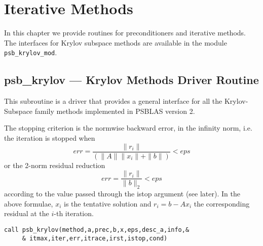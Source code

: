 \section{Iterative Methods}
\label{sec:methods}

In this chapter we provide routines for preconditioners and iterative
methods. The interfaces for Krylov subspace methods are available in
the module \verb|psb_krylov_mod|.

%
%

\clearpage\subsection*{psb\_krylov \label{krylov} --- Krylov Methods Driver
      Routine}

This subroutine is a driver that provides a general interface for all
the Krylov-Subspace family methods implemented in PSBLAS version 2. 

The stopping criterion is the normwise backward error, in the infinity
norm, i.e. the iteration is stopped when 
\[ err = \frac{\|r_i\|}{(\|A\|\|x_i\|+\|b\|)} < eps \]
or the 2-norm residual reduction
\[ err = \frac{\|r_i\|}{\|b\|_2} < eps \]
according to the value passed through the  istop argument (see
later). In the above formulae, $x_i$ is the tentative solution and
$r_i=b-Ax_i$ the corresponding residual at the $i$-th iteration. 


\begin{verbatim}
call psb_krylov(method,a,prec,b,x,eps,desc_a,info,&
     & itmax,iter,err,itrace,irst,istop,cond)
\end{verbatim}

